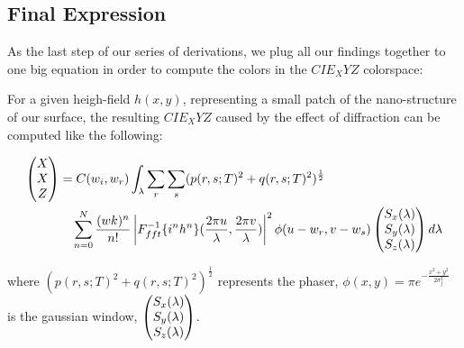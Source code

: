 \subsection{Final Expression}
As the last step of our series of derivations, we plug all our findings together to one big equation in order to compute the colors in the $CIE_XYZ$ colorspace:

For a given heigh-field $h(x,y)$, representing a small patch of the nano-structure of our surface, the resulting $CIE_XYZ$ caused by the effect of diffraction can be computed like the following: 

\begin{equation}
\begin{split}
\colvec[X]{X}{Z}& = C(w_i,w_r) \int_{\lambda} \sum_r \sum_s (p(r,s;T)^2 + q(r,s;T)^2)^{\frac{1}{2}} \\
& \quad \sum_{n=0}^N  \frac{(wk)^n}{n!} \left| {F}_{fft}^{-1}\{i^n h^n\}(\frac{2\pi u}{\lambda},\frac{2\pi v}{\lambda})\right|^2 \phi(u-w_r, v-w_s) \colvec[S_x(\lambda)]{S_y(\lambda)}{S_z(\lambda)}d\lambda
\end{split}
\end{equation}

where $(p(r,s;T)^2 + q(r,s;T)^2)^{\frac{1}{2}}$ represents the phaser, $\phi(x,y) = \pi e^{-\frac{x^2 + y^2}{2\sigma_{f}^2}}$ is the gaussian window, $\colvec[S_x(\lambda)]{S_y(\lambda)}{S_z(\lambda)}$.

